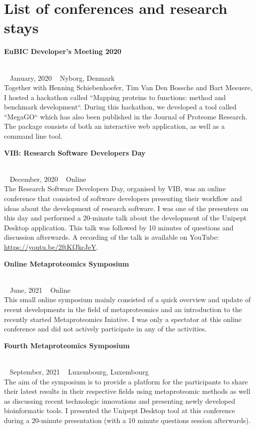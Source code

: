 \chapter*{List of conferences and research stays}

\begin{large}\textbf{\textsf{EuBIC Developer's Meeting 2020}}\end{large} \\
\faCalendar ~ \textsf{January, 2020} \hfill \faGlobe ~ \textsf{Nyborg, Denmark} \\
Together with Henning Schiebenhoefer, Tim Van Den Bossche and Bart Mesuere, I hosted a hackathon called ``Mapping proteins to functions: method and benchmark development``.
During this hackathon, we developed a tool called ``MegaGO`` which has also been published in the Journal of Proteome Research.
The package consists of both an interactive web application, as well as a command line tool.

\begin{large}\textbf{\textsf{VIB: Research Software Developers Day}}\end{large} \\
\faCalendar ~ \textsf{December, 2020} \hfill \faGlobe ~ \textsf{Online} \\
The Research Software Developers Day, organised by VIB, was an online conference that consisted of software developers presenting their workflow and ideas about the development of research software.
I was one of the presenters on this day and performed a 20-minute talk about the development of the Unipept Desktop application. This talk was followed by 10 minutes of questions and discussion afterwards.
A recording of the talk is available on YouTube: \href{https://youtu.be/2ftKfJkcJeY}{https://youtu.be/2ftKfJkcJeY}.

\begin{large}\textbf{\textsf{Online Metaproteomics Symposium}}\end{large} \\
\faCalendar ~ \textsf{June, 2021} \hfill \faGlobe ~ \textsf{Online} \\
This small online symposium mainly consisted of a quick overview and update of recent developments in the field of metaproteomics and an introduction to the recently started Metaproteomics Iniative.
I was only a spectator at this online conference and did not actively participate in any of the activities.

\pagebreak

\begin{large}\textbf{\textsf{Fourth Metaproteomics Symposium}}\end{large} \\
\faCalendar ~ \textsf{September, 2021} \hfill \faGlobe ~ \textsf{Luxembourg, Luxembourg} \\
The aim of the symposium is to provide a platform for the participants to share their latest results in their respective fields using metaproteomic methods as well as discussing recent technologic innovations and presenting newly developed bioinformatic tools.
I presented the Unipept Desktop tool at this conference during a 20-minute presentation (with a 10 minute questions session afterwards).

